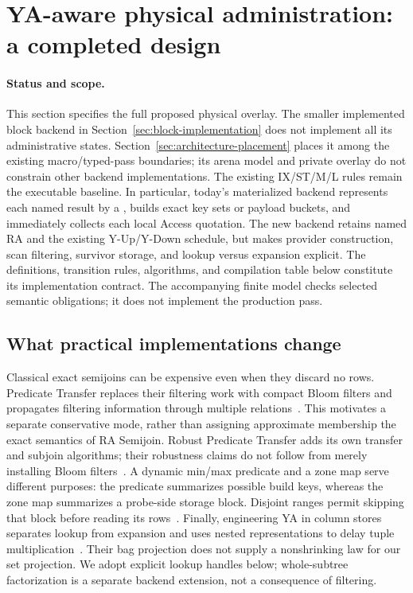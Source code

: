 \section{YA-aware physical administration: a completed design}
\label{sec:ya-physical}
\paragraph{Status and scope.}
This section specifies the full proposed physical overlay. The smaller
implemented block backend in Section~\ref{sec:block-implementation} does not
implement all its administrative states. Section~\ref{sec:architecture-placement}
places it among the existing macro/typed-pass boundaries; its arena model and
private overlay do not constrain other backend implementations. The existing IX/ST/M/L rules remain the executable
baseline. In particular, today's materialized backend represents each named
result by a , builds exact key sets or payload buckets, and
immediately collects each local Access quotation. The new backend retains
named RA and the existing Y-Up/Y-Down schedule, but makes provider construction,
scan filtering, survivor storage, and lookup versus expansion explicit.
The definitions, transition rules, algorithms, and compilation table below
constitute its implementation contract. The accompanying finite model checks
selected semantic obligations; it does not implement the production pass.

\subsection{What practical implementations change}
Classical exact semijoins can be expensive even when they discard no rows.
Predicate Transfer replaces their filtering work with compact Bloom filters
and propagates filtering information through multiple relations~\cite{ya-pt}.
This motivates a separate conservative mode, rather than assigning approximate
membership the exact semantics of RA Semijoin. Robust Predicate Transfer adds
its own transfer and subjoin algorithms; their robustness claims do not follow
from merely installing Bloom filters~\cite{ya-rpt}.
A dynamic min/max predicate and a zone map serve different purposes: the
predicate summarizes possible build keys, whereas the zone map summarizes a
probe-side storage block. Disjoint ranges permit skipping that block before
reading its rows~\cite{ya-duckdb,ya-zonemap}.
Finally, engineering YA in column stores separates lookup from expansion and
uses nested representations to delay tuple multiplication~\cite{ya-shredded}.
Their bag projection does not supply a nonshrinking law for our set
projection. We adopt explicit lookup handles below; whole-subtree factorization is a
separate backend extension, not a consequence of filtering.

